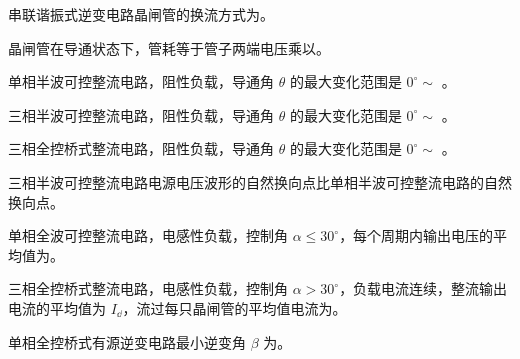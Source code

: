 \documentclass[电力电子]{subfiles}
\begin{document}
\begin{ti}
	串联谐振式逆变电路晶闸管的换流方式为。
\end{ti}

\begin{ti}
	晶闸管在导通状态下，管耗等于管子两端电压乘以。
\end{ti}

\begin{ti}
	单相半波可控整流电路，阻性负载，导通角 $\theta$ 的最大变化范围是 $0^\circ \sim $ 。
\end{ti}

\begin{ti}
	三相半波可控整流电路，阻性负载，导通角 $\theta$ 的最大变化范围是 $0^\circ \sim $ 。
\end{ti}

\begin{ti}
	三相全控桥式整流电路，阻性负载，导通角 $\theta$ 的最大变化范围是 $0^\circ \sim $ 。
\end{ti}

\begin{ti}
	三相半波可控整流电路电源电压波形的自然换向点比单相半波可控整流电路的自然换向点。
\end{ti}

\begin{ti}
	单相全波可控整流电路，电感性负载，控制角 $\alpha \leq 30^\circ$，每个周期内输出电压的平均值为。
\end{ti}

\begin{ti}
	三相全控桥式整流电路，电感性负载，控制角 $\alpha > 30^\circ$，负载电流连续，整流输出电流的平均值为 $I_{\dd}$，流过每只晶闸管的平均值电流为。
\end{ti}

\begin{ti}
	单相全控桥式有源逆变电路最小逆变角 $\beta$ 为。
\end{ti}
\end{document}
